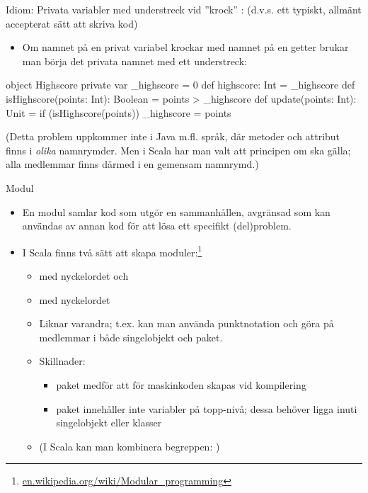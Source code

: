 \begin{Slide}{Idiom: Privata variabler med understreck vid ''krock''}\SlideFontSmall
{}: (d.v.s. ett typiskt, allmänt accepterat sätt att skriva kod)
\begin{itemize}
  \item Om namnet på en privat variabel krockar med namnet på en getter
  brukar man börja det privata namnet med ett understreck:
\end{itemize}

\begin{CodeSmall}
object Highscore {
  private var _highscore = 0
  def highscore: Int = _highscore
  def isHighscore(points: Int): Boolean = points > _highscore
  def update(points: Int): Unit = if (isHighscore(points)) _highscore = points
}
\end{CodeSmall}

\pause

(Detta problem uppkommer inte i Java m.fl. språk, där metoder och attribut finns i \emph{olika} namnrymder.
Men i Scala har man valt att principen om  ska gälla; alla medlemmar finns därmed i en gemensam namnrymd.)

\end{Slide}


\begin{Slide}{Modul}

\begin{itemize}
  \item En modul samlar kod som utgör en sammanhållen, avgränsad  som kan användas av annan kod  för att lösa ett specifikt (del)problem.
  \item I Scala finns två sätt att skapa moduler:\footnote{\href{https://en.wikipedia.org/wiki/Modular_programming}{en.wikipedia.org/wiki/Modular\_programming}}
  \begin{itemize}
    \item {} med nyckelordet  och
    \item {} med nyckelordet 
    \pause
    \item Liknar varandra; t.ex. kan man använda punktnotation och göra  på medlemmar i både singelobjekt och paket.
    \pause
    \item Skillnader:
    \begin{itemize}
      \item paket medför att  för maskinkoden skapas vid kompilering
      \item paket innehåller inte variabler på topp-nivå; dessa behöver ligga inuti singelobjekt eller klasser
    \end{itemize}
    \item (I Scala kan man kombinera begreppen: )
  \end{itemize}

\end{itemize}
\end{Slide}





